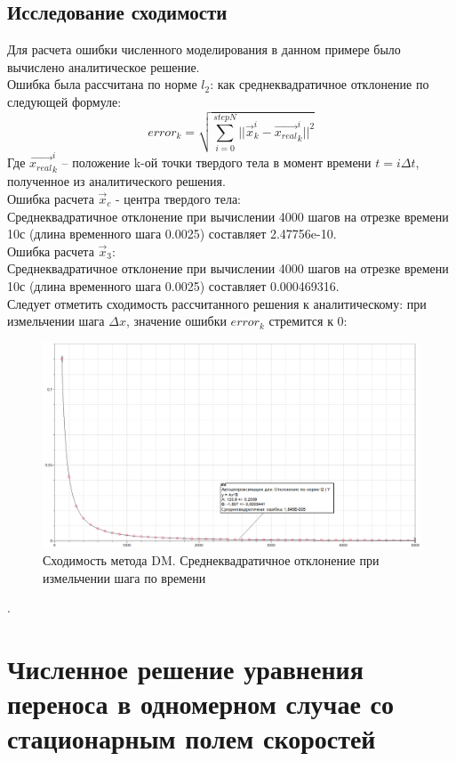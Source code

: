 \documentclass[12pt,a4paper]{article}
\begin{document}
\subsection{Исследование сходимости}
Для расчета ошибки численного моделирования в данном примере было вычислено аналитическое решение.\\
Ошибка была рассчитана по норме $l_2$: как среднеквадратичное отклонение по следующей формуле:
\[
error_k=\sqrt{\sum_{i=0}^{stepN}||\overrightarrow{x}_k^i-\overrightarrow{x_{real}}_k^i||^2}
\]
Где $\overrightarrow{x_{real}}_k^i$ – положение k-ой точки твердого тела в момент времени $t=i\Delta t$, полученное из аналитического решения.\\
Ошибка расчета $\overrightarrow{x}_c$ - центра твердого тела:\\
Среднеквадратичное отклонение при вычислении 4000 шагов на отрезке времени 10с (длина временного шага 0.0025) составляет 2.47756e-10.\\
Ошибка расчета $\overrightarrow{x}_3$:\\
Среднеквадратичное отклонение при вычислении 4000 шагов на отрезке времени 10с (длина временного шага 0.0025) составляет 0.000469316.\\
Следует отметить сходимость рассчитанного решения к аналитическому: при измельчении шага $\Delta x$, значение ошибки $error_k$ стремится к 0:\\
\begin{figure}[h!]
  \includegraphics[width=\linewidth]{Pictures/dm_error_convergence.png}
  \caption{Сходимость метода DM. Среднеквадратичное отклонение при измельчении шага по времени}
  \label{fig:dm_err}
\end{figure}
.\\

\section{Численное решение уравнения переноса в одномерном случае со стационарным полем скоростей}
\end{document}
